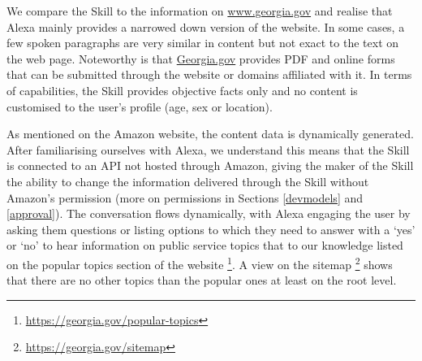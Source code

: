 




We compare the Skill to the information on \url{www.georgia.gov} and realise that Alexa mainly provides a narrowed down version of the website. In some cases, a few spoken paragraphs are very similar in content but not exact to the text on the web page. Noteworthy is that \href{www.georgia.gov}{Georgia.gov} provides PDF and online forms that can be submitted through the website or domains affiliated with it. In terms of capabilities, the Skill provides objective facts only and no content is customised to the user's profile (age, sex or location). 



As mentioned on the Amazon website, the content data is dynamically generated. After familiarising ourselves with Alexa, we understand this means that the Skill is connected to an API not hosted through Amazon, giving the maker of the Skill the ability to change the information delivered through the Skill without Amazon's permission (more on permissions in Sections \ref{devmodels} and \ref{approval}). The conversation flows dynamically, with Alexa engaging the user by asking them questions or listing options to which they need to answer with a `yes' or `no' to hear information on public service topics that to our knowledge listed on the popular topics section of the website \footnote{\url{https://georgia.gov/popular-topics}}. A view on the sitemap \footnote{\url{https://georgia.gov/sitemap}} shows that there are no other topics than the popular ones at least on the root level.





